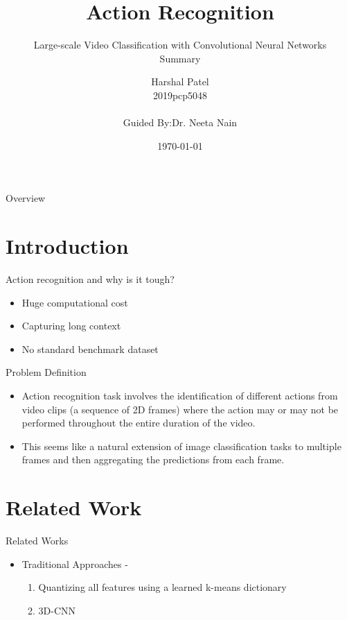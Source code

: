 \documentclass[pdf]{beamer}
\title{Action Recognition}
\subtitle{Large-scale Video Classification with Convolutional Neural Networks
\\Summary}
\author{Harshal Patel\\2019pcp5048\\\\Guided By:Dr. Neeta Nain}
\institute{MNIT}
\date{\today}
\begin{document}
    \begin{frame}
    \titlepage
    \end{frame}
    
    \begin{frame}{Overview}
    \tableofcontents
    \end{frame}
    
    \section{Introduction}
    \begin{frame}{Action recognition and why is it tough?}
        \begin{itemize}
            \item Huge computational cost
            \item Capturing long context
            \item No standard benchmark dataset
        \end{itemize} 
    \end{frame}
    \begin{frame}{Problem Definition}
        \begin{itemize}
            \item Action recognition task involves the identification of different actions from video clips (a sequence of 2D frames) where the action may or may not be performed throughout the entire duration of the video. 
            \item This seems like a natural extension of image classification tasks to multiple frames and then aggregating the predictions from each frame. 
            
           
        \end{itemize}
    \end{frame}
    
    \section{Related Work}
    \begin{frame}{Related Works}
    \begin{itemize}
        \item Traditional Approaches -
        \begin{enumerate}
            \item  Quantizing all
features using a learned k-means dictionary
            \item 3D-CNN \cite{3dcnn}
        \end{enumerate}
    \end{itemize}
    \end{frame}
    
\end{document}
